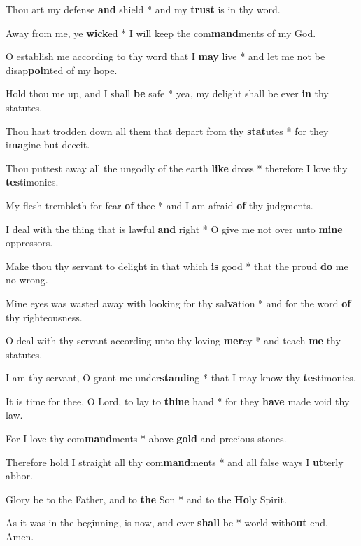 \begin{multicols}{2}
	Thou art my defense \textbf{and} shield * and my \textbf{trust} is in thy word.
	
	Away from me, ye \textbf{wick}ed * I will keep the com\textbf{mand}ments of my God.
	
	O establish me according to thy word that I \textbf{may} live * and let me not be disap\textbf{poin}ted of my hope.
	
	Hold thou me up, and I shall \textbf{be} safe * yea, my delight shall be ever \textbf{in} thy statutes.
	
	Thou hast trodden down all them that depart from thy \textbf{stat}utes * for they i\textbf{ma}gine but deceit.
	
	Thou puttest away all the ungodly of the earth \textbf{like} dross * therefore I love thy \textbf{tes}timonies.
	
	My flesh trembleth for fear \textbf{of} thee * and I am afraid \textbf{of} thy judgments.
	
	I deal with the thing that is lawful \textbf{and} right * O give me not over unto \textbf{mine} oppressors.
	
	Make thou thy servant to delight in that which \textbf{is} good * that the proud \textbf{do} me no wrong.
	
	Mine eyes was wasted away with looking for thy sal\textbf{va}tion * and for the word \textbf{of} thy righteousness.
	
	O deal with thy servant according unto thy loving \textbf{mer}cy * and teach \textbf{me} thy statutes.
	
	I am thy servant, O grant me under\textbf{stand}ing * that I may know thy \textbf{tes}timonies.
	
	It is time for thee, O Lord, to lay to \textbf{thine} hand * for they \textbf{have} made void thy law.
	
	For I love thy com\textbf{mand}ments * above \textbf{gold} and precious stones.
	
	Therefore hold I straight all thy com\textbf{mand}ments * and all false ways I \textbf{ut}terly abhor. 
	
	Glory be to the Father, and to \textbf{the} Son * and to the \textbf{Ho}ly Spirit.
	
	As it was in the beginning, is now, and ever \textbf{shall} be * world with\textbf{out} end. Amen.
\end{multicols}